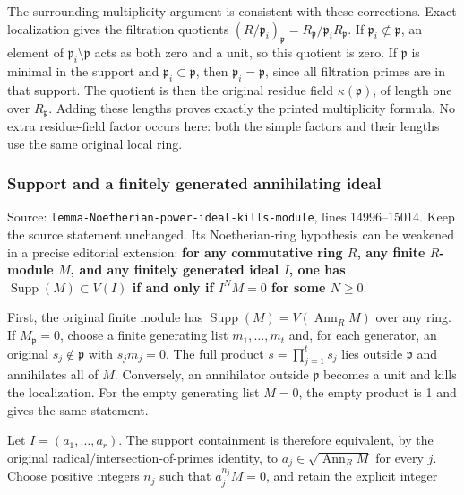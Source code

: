 The surrounding multiplicity argument is consistent with these corrections. Exact localization gives the filtration quotients \((R/\mathfrak p_i)_{\mathfrak p}=R_{\mathfrak p}/\mathfrak p_iR_{\mathfrak p}\). If \(\mathfrak p_i\not\subset\mathfrak p\), an element of \(\mathfrak p_i\setminus\mathfrak p\) acts as both zero and a unit, so this quotient is zero. If \(\mathfrak p\) is minimal in the support and \(\mathfrak p_i\subset\mathfrak p\), then \(\mathfrak p_i=\mathfrak p\), since all filtration primes are in that support. The quotient is then the original residue field \(\kappa(\mathfrak p)\), of length one over \(R_{\mathfrak p}\). Adding these lengths proves exactly the printed multiplicity formula. No extra residue-field factor occurs here: both the simple factors and their lengths use the same original local ring.

\subsubsection{Support and a finitely generated annihilating ideal}\label{algebra-proof-004-support-and-a-finitely-generated-annihilating-ideal}

Source: \texttt{lemma-\AlgebraIdentifierBreak{}Noetherian-\AlgebraIdentifierBreak{}power-\AlgebraIdentifierBreak{}ideal-\AlgebraIdentifierBreak{}kills-\AlgebraIdentifierBreak{}module}, lines 14996--15014. Keep the source statement unchanged. Its Noetherian-ring hypothesis can be weakened in a precise editorial extension: \textbf{for any commutative ring \(R\), any finite \(R\)-module \(M\), and any finitely generated ideal \(I\), one has \(\operatorname{Supp}(M)\subset V(I)\) if and only if \(I^NM=0\) for some \(N\geq0\)}.

First, the original finite module has \(\operatorname{Supp}(M)=V(\operatorname{Ann}_R M)\) over any ring. If \(M_{\mathfrak p}=0\), choose a finite generating list \(m_1,\ldots,m_t\) and, for each generator, an original \(s_j\notin\mathfrak p\) with \(s_jm_j=0\). The full product \(s=\prod_{j=1}^t s_j\) lies outside \(\mathfrak p\) and annihilates all of \(M\). Conversely, an annihilator outside \(\mathfrak p\) becomes a unit and kills the localization. For the empty generating list \(M=0\), the empty product is 1 and gives the same statement.

Let \(I=(a_1,\ldots,a_r)\). The support containment is therefore equivalent, by the original radical/intersection-of-primes identity, to \(a_j\in\sqrt{\operatorname{Ann}_R M}\) for every \(j\). Choose positive integers \(n_j\) such that \(a_j^{n_j}M=0\), and retain the explicit integer

